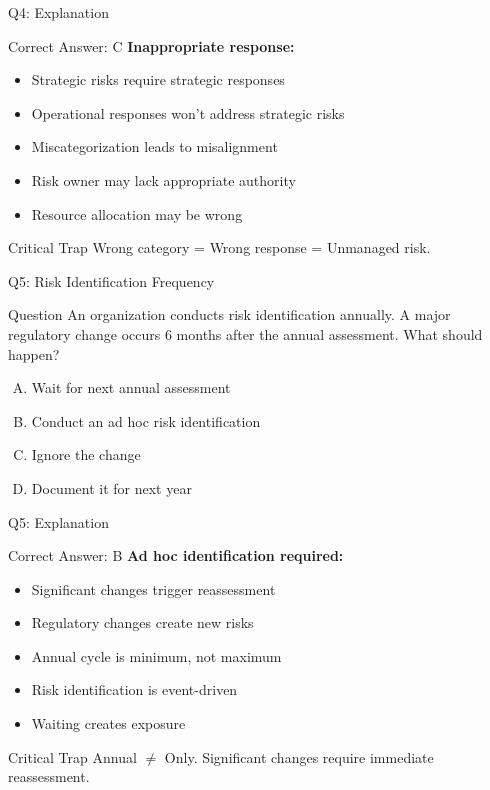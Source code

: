\documentclass{beamer}
\begin{document}
			\begin{frame}{Q4: Explanation}
				\begin{block}{Correct Answer: C}
					\textbf{Inappropriate response:}
					\begin{itemize}
						\item Strategic risks require strategic responses
						\item Operational responses won't address strategic risks
						\item Miscategorization leads to misalignment
						\item Risk owner may lack appropriate authority
						\item Resource allocation may be wrong
					\end{itemize}
				\end{block}
				\begin{alertblock}{Critical Trap}
					Wrong category = Wrong response = Unmanaged risk.
				\end{alertblock}
			\end{frame}
			
			\begin{frame}{Q5: Risk Identification Frequency}
				\begin{block}{Question}
					An organization conducts risk identification annually. A major regulatory change occurs 6 months after the annual assessment. What should happen?
				\end{block}
				\begin{enumerate}[(A)]
					\item Wait for next annual assessment
					\item Conduct an ad hoc risk identification
					\item Ignore the change
					\item Document it for next year
				\end{enumerate}
			\end{frame}
			
			\begin{frame}{Q5: Explanation}
				\begin{block}{Correct Answer: B}
					\textbf{Ad hoc identification required:}
					\begin{itemize}
						\item Significant changes trigger reassessment
						\item Regulatory changes create new risks
						\item Annual cycle is minimum, not maximum
						\item Risk identification is event-driven
						\item Waiting creates exposure
					\end{itemize}
				\end{block}
				\begin{alertblock}{Critical Trap}
					Annual $\neq$ Only. Significant changes require immediate reassessment.
				\end{alertblock}
			\end{frame}
			
\end{document}
